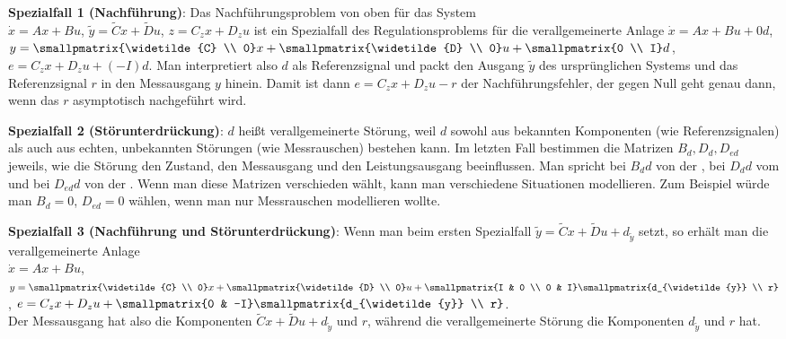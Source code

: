 \linie

\textbf{Spezialfall 1 (Nachführung)}:
Das Nachführungsproblem von oben für das System\\
$\dot{x} = Ax + Bu$, $\widetilde{y} = \widetilde{C}x + \widetilde{D}u$,
$z = C_z x + D_z u$ ist ein Spezialfall des Regulationsproblems für die verallgemeinerte Anlage
$\dot{x} = Ax + Bu + 0d$,
$y = \smallpmatrix{\widetilde{C} \\ 0} x + \smallpmatrix{\widetilde{D} \\ 0} u +
\smallpmatrix{0 \\ I} d$,
$e = C_z x + D_z u + (-I)d$.
Man interpretiert also $d$ als Referenzsignal und packt den Ausgang $\widetilde{y}$ des
ursprünglichen Systems und das Referenzsignal $r$ in den Messausgang $y$ hinein.
Damit ist dann $e = C_z x + D_z u - r$ der Nachführungsfehler, der gegen Null geht genau dann,
wenn das $r$ asymptotisch nachgeführt wird.

\linie

\textbf{Spezialfall 2 (Störunterdrückung)}:
$d$ heißt verallgemeinerte Störung, weil $d$
sowohl aus bekannten Komponenten (wie Referenzsignalen)
als auch aus echten, unbekannten Störungen (wie Messrauschen) bestehen kann.
Im letzten Fall bestimmen die Matrizen $B_d, D_d, D_{ed}$ jeweils, wie die Störung den Zustand,
den Messausgang und den Leistungsausgang beeinflussen.
Man spricht bei $B_d d$ von der ,
bei $D_d d$ vom  und
bei $D_{ed} d$ von der .
Wenn man diese Matrizen verschieden wählt, kann man verschiedene Situationen modellieren.
Zum Beispiel würde man $B_d = 0$, $D_{ed} = 0$ wählen, wenn man nur Messrauschen modellieren
wollte.

\linie

\textbf{Spezialfall 3 (Nachführung und Störunterdrückung)}:
Wenn man beim ersten Spezialfall
$\widetilde{y} = \widetilde{C} x + \widetilde{D} u + d_{\widetilde{y}}$ setzt, so erhält man
die verallgemeinerte Anlage\\
$\dot{x} = Ax + Bu$,
$y = \smallpmatrix{\widetilde{C} \\ 0} x + \smallpmatrix{\widetilde{D} \\ 0} u +
\smallpmatrix{I & 0 \\ 0 & I} \smallpmatrix{d_{\widetilde{y}} \\ r}$,
$e = C_z x + D_z u + \smallpmatrix{0 & -I} \smallpmatrix{d_{\widetilde{y}} \\ r}$.\\
Der Messausgang hat also die Komponenten $\widetilde{C} x + \widetilde{D} u + d_{\widetilde{y}}$
und $r$,
während die verallgemeinerte Störung die Komponenten $d_{\widetilde{y}}$ und $r$ hat.

